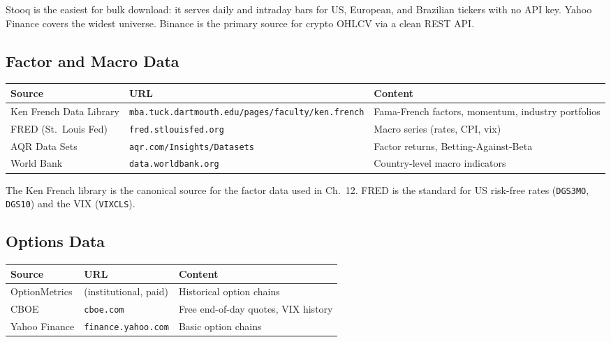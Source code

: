 Stooq is the easiest for bulk download: it serves daily and intraday
bars for US, European, and Brazilian tickers with no API key. Yahoo
Finance covers the widest universe. Binance is the primary source for
crypto OHLCV via a clean REST API.

\subsection{Factor and Macro Data}

\begin{center}
\begin{tabular}{lll}
\toprule
\textbf{Source} & \textbf{URL} & \textbf{Content} \\
\midrule
Ken French Data Library & \texttt{mba.tuck.dartmouth.edu/pages/faculty/ken.french} & Fama-French factors, momentum, industry portfolios \\
FRED (St.\ Louis Fed) & \texttt{fred.stlouisfed.org} & Macro series (rates, CPI, vix) \\
AQR Data Sets & \texttt{aqr.com/Insights/Datasets} & Factor returns, Betting-Against-Beta \\
World Bank & \texttt{data.worldbank.org} & Country-level macro indicators \\
\bottomrule
\end{tabular}
\end{center}

The Ken French library is the canonical source for the factor data
used in Ch.~12. FRED is the standard for US risk-free rates
(\texttt{DGS3MO}, \texttt{DGS10}) and the VIX (\texttt{VIXCLS}).

\subsection{Options Data}

\begin{center}
\begin{tabular}{lll}
\toprule
\textbf{Source} & \textbf{URL} & \textbf{Content} \\
\midrule
OptionMetrics & (institutional, paid) & Historical option chains \\
CBOE & \texttt{cboe.com} & Free end-of-day quotes, VIX history \\
Yahoo Finance & \texttt{finance.yahoo.com} & Basic option chains \\
\bottomrule
\end{tabular}
\end{center}

